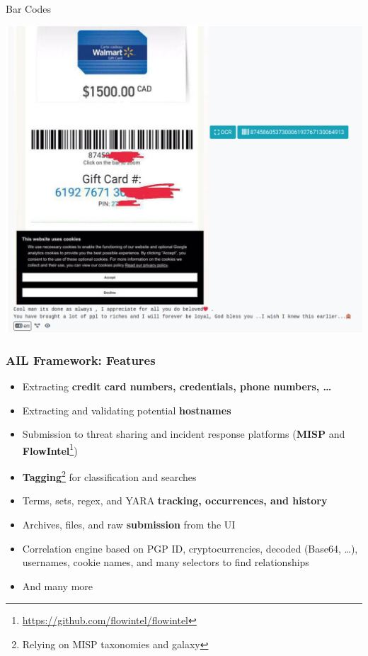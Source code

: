 \documentclass{beamer}
\begin{document}
\begin{frame}[fragile]{Bar Codes}
    \begin{center}
        \includegraphics[scale=0.22]{screenshot/barcode.png}
    \end{center}
\end{frame}

\begin{frame}
    \frametitle{AIL Framework: Features}
    \begin{itemize}
        \item Extracting \textbf{credit card numbers, credentials, phone numbers, \dots}
        \item Extracting and validating potential \textbf{hostnames}
        \item Submission to threat sharing and incident response platforms (\textbf{MISP} and \textbf{FlowIntel}\footnote{\url{https://github.com/flowintel/flowintel}})
        \item \textbf{Tagging}\footnote{Relying on MISP taxonomies and galaxy} for classification and searches
        \item Terms, sets, regex, and YARA \textbf{tracking, occurrences, and history}
        \item Archives, files, and raw \textbf{submission} from the UI
        \item Correlation engine based on PGP ID, cryptocurrencies, decoded (Base64, \dots), usernames, cookie names, and many selectors to find relationships
        \item And many more
    \end{itemize}
\end{frame}
\end{document}
